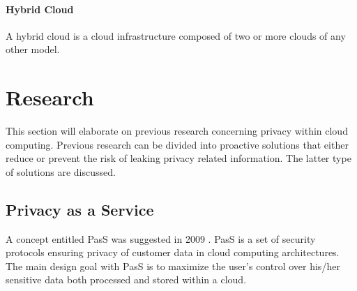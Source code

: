 \documentclass[pdftex,english,10pt,b5paper,twoside]{book}
\begin{document}
\paragraph{Hybrid Cloud} A hybrid cloud is a cloud infrastructure composed of
two or more clouds of any other model.

\section{Research}

This section will elaborate on previous research concerning privacy within cloud
computing. Previous research can be divided into proactive solutions that
either reduce or prevent the risk of leaking privacy related information. The
latter type of solutions are discussed.

\subsection{Privacy as a Service}
A concept entitled \ac{PasS} was suggested in 2009
\cite{PasS}. PasS is a set of security protocols ensuring privacy of customer
data in cloud computing architectures. The main design goal with PasS is to
maximize the user's control over his/her sensitive data both processed and stored
within a cloud.
\end{document}
